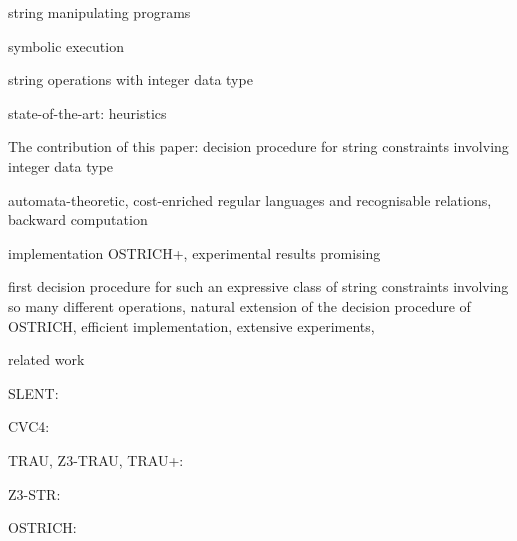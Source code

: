 
string manipulating programs

symbolic execution

string operations with integer data type

state-of-the-art: heuristics

The contribution of this paper: decision procedure for string constraints involving integer data type

automata-theoretic, cost-enriched regular languages and recognisable relations, backward computation

implementation OSTRICH+, experimental results promising

first decision procedure for such an expressive class of string constraints involving so many different operations, natural extension of the decision procedure of OSTRICH, efficient implementation, extensive experiments, 

related work

SLENT: \cite{WC+18}

CVC4: \cite{cvc4}

TRAU, Z3-TRAU, TRAU+: \cite{Abdulla17,AbdullaA+19}

Z3-STR: \cite{Z3-str}

OSTRICH: \cite{CHL+19}